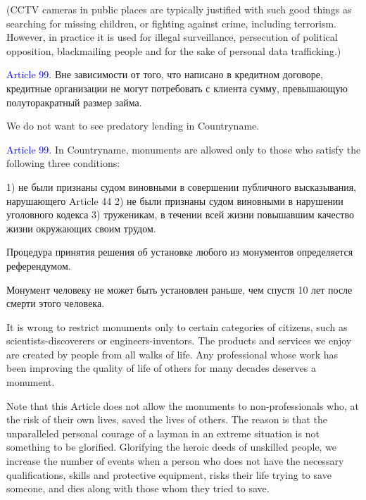 \documentclass[11pt]{article}
\theoremstyle{remark}
\theoremstyle{definition}
\begin{document}
(CCTV cameras in public places are typically justified with such good things as searching for missing children, or fighting against crime, including terrorism. However, in practice it is used for illegal surveillance, persecution of political opposition, blackmailing people and for the sake of personal data trafficking.)


\color{black}


\textcolor{blue}{Article 99.} Вне зависимости от того, что написано в кредитном договоре, кредитные организации не могут потребовать с клиента сумму, превышающую полуторакратный размер займа.

\color{blue}

We do not want to see predatory lending in Countryname. 



\color{black}


\textcolor{blue}{Article 99.} In Countryname, monuments are allowed only to those who satisfy the following three conditions:

1) не были признаны судом виновными в совершении публичного высказывания, нарушающего Article 44
2) не были признаны судом виновными в нарушении уголовного кодекса
3) труженикам, в течении всей жизни повышавшим качество жизни окружающих своим трудом.

Процедура принятия решения об установке любого из монументов определяется референдумом.

Монумент человеку не может быть установлен раньше, чем спустя 10 лет после смерти этого человека.

\color{blue}



It is wrong to restrict monuments only to certain categories of citizens, such as scientists-discoverers or engineers-inventors. The products and services we enjoy are created by people from all walks of life. Any professional whose work has been improving the quality of life of others for many decades deserves a monument.


Note that this Article does not allow the monuments to non-professionals who, at the risk of their own lives, saved the lives of others. The reason is that the unparalleled personal courage of a layman in an extreme situation is not something to be glorified. Glorifying the heroic deeds of unskilled people, we increase the number of events when a person who does not have the necessary qualifications, skills and protective equipment, risks their life trying to save someone, and dies along with those whom they tried to save.
\end{document}
